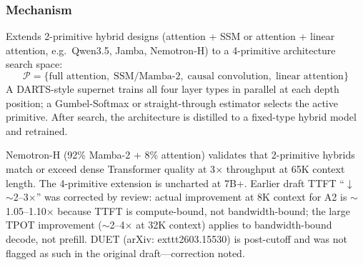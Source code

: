\documentclass[11pt]{article}
\begin{document}
\subsubsection*{Mechanism}
Extends 2-primitive hybrid designs (attention + SSM or attention + linear attention, e.g.\ Qwen3.5, Jamba, Nemotron-H) to a 4-primitive architecture search space:
\[
  \mathcal{P} = \{\text{full attention},\; \text{SSM/Mamba-2},\; \text{causal convolution},\; \text{linear attention}\}
\]
A DARTS-style supernet trains all four layer types in parallel at each depth position; a Gumbel-Softmax or straight-through estimator selects the active primitive.
After search, the architecture is distilled to a fixed-type hybrid model and retrained.

Nemotron-H (92\% Mamba-2 + 8\% attention) validates that 2-primitive hybrids match or exceed dense Transformer quality at 3$\times$ throughput at 65K context length.
The 4-primitive extension is uncharted at 7B+.
Earlier draft TTFT ``$\downarrow$ $\sim$2--3$\times$'' was corrected by review: actual improvement at 8K context for A2 is $\sim$1.05--1.10$\times$ because TTFT is compute-bound, not bandwidth-bound; the large TPOT improvement ($\sim$2--4$\times$ at 32K context) applies to bandwidth-bound decode, not prefill.
DUET (arXiv:	exttt{2603.15530}) is post-cutoff and was not flagged as such in the original draft---correction noted.
\end{document}
